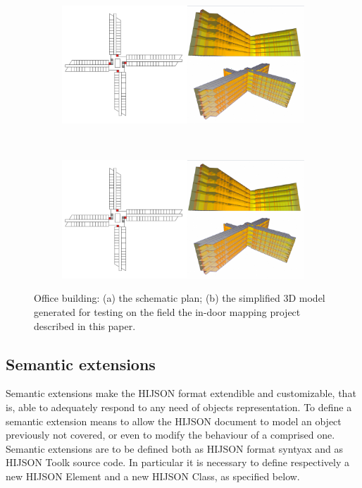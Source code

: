 \begin{figure}[!h]
 \centering
 \begin{subfigure}[b]{0.48\linewidth}
 \includegraphics[width=\textwidth]{images/sogei-a} 
 \caption{}
 \label{fig:sogei-a}
 \end{subfigure}
 ~
 \begin{subfigure}[b]{0.48\linewidth}
 \includegraphics[width=\textwidth]{images/sogei-b}
 \caption{}
 \label{fig:sogei-b}
 \end{subfigure}
 
 \caption{Office building: 
 (a) the schematic plan; 
 (b) the simplified 3D model generated for testing on the field 
 the in-door mapping project described in this paper.
 }
 \label{fig:sogei}
\end{figure}

\subsection{Semantic extensions}\label{semantic-extensions}

Semantic extensions make the HIJSON format extendible and customizable, that
is, able to adequately respond to any need of objects representation. To define a
semantic extension means to allow the HIJSON document to model an object
previously not covered, or even to modify the behaviour of a comprised one.
Semantic extensions are to be defined both as HIJSON format syntyax and as
HIJSON Toolk source code. In particular it is necessary to define respectively
a new HIJSON Element and a new HIJSON Class, as specified below.

